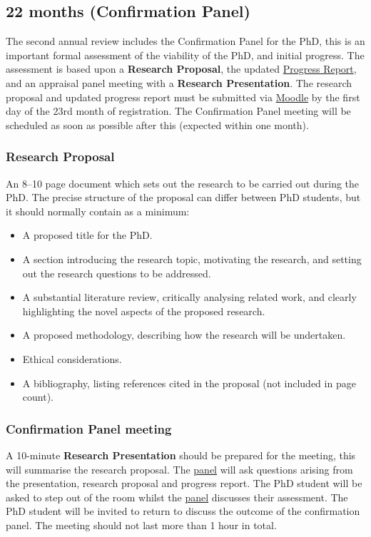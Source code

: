 \documentclass[12pt,a4paper]{article}
\begin{document}
\subsection{22 months (Confirmation Panel)} \label{sec:22months}
The second annual review includes the Confirmation Panel for the PhD, this is an important formal assessment of the viability of the PhD, and initial progress. The assessment is based upon a \textbf{Research Proposal}, the updated \hyperref[sec:report]{Progress Report}, and an appraisal panel meeting with a \textbf{Research Presentation}. The research proposal and updated progress report must be submitted via \href{https://modules.lancaster.ac.uk/course/view.php?id=7050}{Moodle} by the first day of the 23rd month of registration. The Confirmation Panel meeting will be scheduled as soon as possible after this (expected within one month).

\subsubsection{Research Proposal}
An 8--10 page document which sets out the research to be carried out during the PhD. The precise structure of the proposal can differ between PhD students, but it should normally contain as a minimum:
\begin{itemize}
	\item A proposed title for the PhD.
	\item A section introducing the research topic, motivating the research, and setting out the research questions to be addressed.
	\item A substantial literature review, critically analysing related work, and clearly highlighting the novel aspects of the proposed research.
	\item A proposed methodology, describing how the research will be undertaken.
	\item Ethical considerations.
	\item A bibliography, listing references cited in the proposal (not included in page count).
\end{itemize}

\subsubsection{Confirmation Panel meeting}
A 10-minute \textbf{Research Presentation} should be prepared for the meeting, this will summarise the research proposal. The \hyperref[sec:panel]{panel} will ask questions arising from the presentation, research proposal and progress report. The PhD student will be asked to step out of the room whilst the \hyperref[sec:panel]{panel} discusses their assessment. The PhD student will be invited to return to discuss the outcome of the confirmation panel. The meeting should not last more than 1 hour in total.
\end{document}
